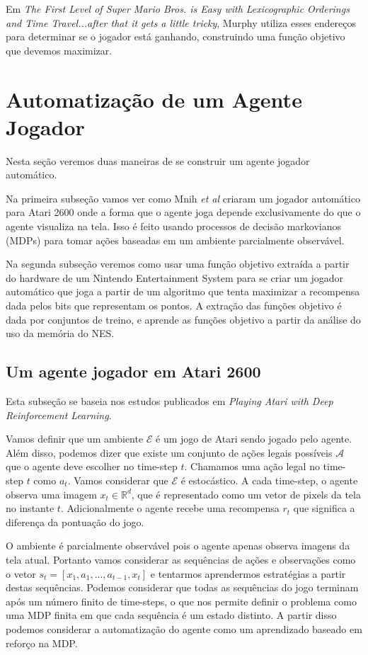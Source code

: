 \documentclass[a4paper,10pt]{article}
\theoremstyle{plain}
\begin{document}
Em \textit{The First Level of Super Mario Bros. is Easy with Lexicographic Orderings and Time
Travel...\small after that it gets a little tricky}, Murphy utiliza esses endereços para determinar
se o jogador está ganhando, construindo uma função objetivo que devemos maximizar.

\section{Automatização de um Agente Jogador}

Nesta seção veremos duas maneiras de se construir um agente jogador automático.

Na primeira subseção vamos ver como Mnih \textit{et al} criaram um jogador automático para Atari
2600 onde a forma que o agente joga depende exclusivamente do que o agente visualiza na tela. Isso
é feito usando processos de decisão markovianos (MDPs) para tomar ações baseadas em um ambiente
parcialmente observável.

Na segunda subseção veremos como usar uma função objetivo extraída a partir do hardware de um
Nintendo Entertainment System para se criar um jogador automático que joga a partir de um algoritmo
que tenta maximizar a recompensa dada pelos bits que representam os pontos. A extração das funções
objetivo é dada por conjuntos de treino, e aprende as funções objetivo a partir da análise do uso
da memória do NES.

\subsection{Um agente jogador em Atari 2600}

Esta subseção se baseia nos estudos publicados em \textit{Playing Atari with Deep Reinforcement
Learning}\cite{dqn}.

Vamos definir que um ambiente $\mathcal{E}$ é um jogo de Atari sendo jogado pelo agente. Além
disso, podemos dizer que existe um conjunto de ações legais possíveis $\mathcal{A}$ que o agente
deve escolher no time-step $t$. Chamamos uma ação legal no time-step $t$ como $a_t$. Vamos
considerar que $\mathcal{E}$ é estocástico. A cada time-step, o agente observa uma imagem $x_t \in
\mathbb{R}^d$, que é representado como um vetor de pixels da tela no instante $t$. Adicionalmente
o agente recebe uma recompensa $r_t$ que significa a diferença da pontuação do jogo.

O ambiente é parcialmente observável pois o agente apenas observa imagens da tela atual. Portanto
vamos considerar as sequências de ações e observações como o vetor $s_t=[x_1,a_1,...,a_{t-1},x_t]$
e tentarmos aprendermos estratégias a partir destas sequências. Podemos considerar que todas as
sequências do jogo terminam após um número finito de time-steps, o que nos permite definir o
problema como uma MDP finita em que cada sequência é um estado distinto. A partir disso podemos
considerar a automatização do agente como um aprendizado baseado em reforço na MDP.
\end{document}
